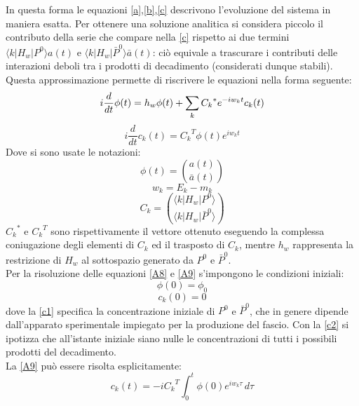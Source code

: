 In questa forma le equazioni \eqref{a},\eqref{b},\eqref{c} descrivono l'evoluzione del sistema in maniera esatta.
Per ottenere una soluzione analitica si considera piccolo il contributo della serie che compare nella \eqref{c} rispetto ai due termini $\langle k|H_w|P^0\rangle a(t)$ e $\langle k|H_w|\bar{P}^0\rangle \bar{a}(t)$: 
ciò equivale a trascurare i contributi delle interazioni deboli tra i prodotti di decadimento (considerati dunque stabili). Questa approssimazione permette di riscrivere le equazioni nella forma seguente:
\begin{equation}\label{A8}
i\frac{d}{dt} \phi(t) = h_w \phi (t) + \sum_{k}{C_k}^* e^{-iw_kt} c_k (t)\\
\end{equation}
\begin{equation}\label{A9}
i\frac{d}{dt} c_k(t) = {C_k}^T \phi(t)e^{iw_kt}
\end{equation}
Dove si sono usate le notazioni:
\begin{equation}\label{1}
 \phi (t) = \binom{a(t)}{\bar{a}(t)}
\end{equation}
\begin{equation}\label{2}
 w_k = E_k - m_k
\end{equation}
\begin{equation}
 C_k = \binom{\langle k|H_w|P^0\rangle}{\langle k|H_w|\bar{P}^0\rangle}
\end{equation}
${C_k}^*$ e ${C_k}^T$ sono rispettivamente il vettore ottenuto eseguendo la complessa coniugazione degli elementi di $C_k$ ed il trasposto di 
$C_k$, mentre $h_w$ rappresenta la restrizione di $H_w$ al sottospazio generato da $P^0$ e $\bar{P}^0$.\\
Per la risoluzione delle equazioni \eqref{A8} e \eqref{A9} s'impongono le condizioni iniziali:
\begin{equation} \label{c1}
 \phi(0) = \phi_0
\end{equation}
\begin{equation}\label{c2}
 c_k(0) = 0
\end{equation}
dove la \eqref{c1} specifica la concentrazione iniziale di $P^0$ e $\bar{P}^0$, che in genere dipende dall'apparato sperimentale impiegato per la produzione del fascio. Con la \eqref{c2} si ipotizza che all'istante iniziale siano nulle le concentrazioni di tutti i possibili prodotti del decadimento.\\
La \eqref{A9} pu\`o essere risolta esplicitamente:
\begin{equation}
 c_k(t) = -i{C_k}^T\int_{0}^{t} \phi(0)e^{iw_k\tau}\, d\tau
\end{equation}
